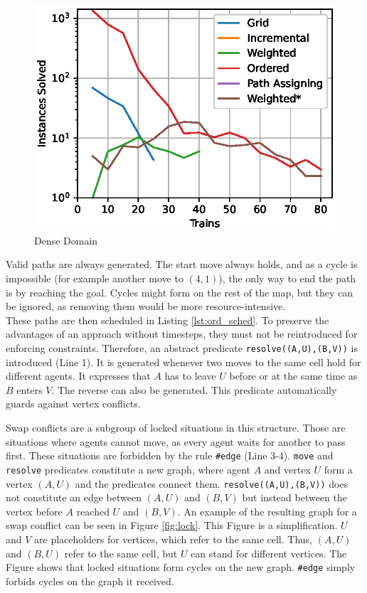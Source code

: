 \documentclass{llncs}
\begin{document}
\begin{multicols*}{2}
\begin{figure}[b]
\begin{minipage}[t]{0.32\textwidth}
        \includegraphics[width=1\textwidth]{images/dense_s.eps}
        \caption{Dense Domain}
        \label{fig:dense}
    \end{minipage}
\end{figure}

Valid paths are always generated. The start move always holds, and as a cycle is impossible (for example another move to $(4,1)$), the only way to end the path is by reaching the goal. Cycles might form on the rest of the map, but they can be ignored, as removing them would be more resource-intensive.\\

These paths are then scheduled in Listing \ref{lst:ord_sched}. To preserve the advantages of an approach without timesteps, they must not be reintroduced for enforcing constraints. Therefore, an abstract predicate \texttt{resolve((A,U),(B,V))} is introduced (Line 1). It is generated whenever two moves to the same cell hold for different agents. It expresses that $A$ has to leave $U$ before or at the same time as $B$ enters $V$. The reverse can also be generated. This predicate automatically guards against vertex conflicts.

Swap conflicts are a subgroup of locked situations in this structure. Those are situations where agents cannot move, as every agent waits for another to pass first. These situations are forbidden by the rule \texttt{\#edge} (Line 3-4). \texttt{move} and \texttt{resolve} predicates constitute a new graph, where agent $A$ and vertex $U$ form a vertex $(A,U)$ and the predicates connect them. \texttt{resolve((A,U),(B,V))} does not constitute an edge between $(A,U)$ and $(B,V)$ but instead between the vertex before $A$ reached $U$ and $(B,V)$. An example of the resulting graph for a swap conflict can be seen in Figure \ref{fig:lock}. This Figure is a simplification. $U$ and $V$ are placeholders for vertices, which refer to the same cell. Thus, $(A,U)$ and $(B,U)$ refer to the same cell, but $U$ can stand for different vertices. The Figure shows that locked situations form cycles on the new graph. \texttt{\#edge} simply forbids cycles on the graph it received.


\end{multicols*}
\end{document}
